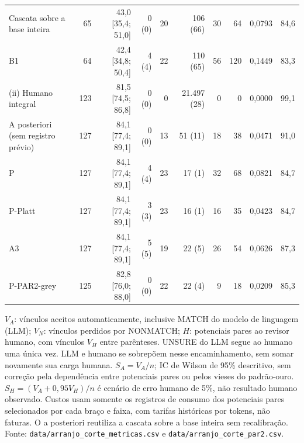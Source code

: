 \begin{longtable}{lrrrrrrrrr}
Cascata sobre a base inteira & 65 & 43,0 [35,4; 51,0] & 0 (0) & 20 & 106 (66) & 30 & 64 & 0,0793 & 84,6 \\
B1 & 64 & 42,4 [34,8; 50,4] & 4 (4) & 22 & 110 (65) & 56 & 120 & 0,1449 & 83,3 \\
(ii) Humano integral & 123 & 81,5 [74,5; 86,8] & 0 (0) & 0 & 21.497 (28) & 0 & 0 & 0,0000 & 99,1 \\
A posteriori (sem registro prévio) & 127 & 84,1 [77,4; 89,1] & 0 (0) & 13 & 51 (11) & 18 & 38 & 0,0471 & 91,0 \\
P & 127 & 84,1 [77,4; 89,1] & 4 (4) & 23 & 17 (1) & 32 & 68 & 0,0821 & 84,7 \\
P-Platt & 127 & 84,1 [77,4; 89,1] & 3 (3) & 23 & 16 (1) & 16 & 35 & 0,0423 & 84,7 \\
A3 & 127 & 84,1 [77,4; 89,1] & 5 (5) & 19 & 22 (5) & 26 & 54 & 0,0626 & 87,3 \\
P-PAR2-grey & 125 & 82,8 [76,0; 88,0] & 0 (0) & 22 & 22 (4) & 9 & 18 & 0,0209 & 85,3 \\
\end{longtable}
\noindent\parbox{\linewidth}{\footnotesize $V_A$: vínculos aceitos automaticamente, inclusive MATCH do modelo de linguagem (LLM); $V_N$: vínculos perdidos por NONMATCH; $H$: potenciais pares ao revisor humano, com vínculos $V_H$ entre parênteses. UNSURE do LLM segue ao humano uma única vez. LLM e humano se sobrepõem nesse encaminhamento, sem somar novamente sua carga humana. $S_A=V_A/n$; IC de Wilson de 95\% descritivo, sem correção pela dependência entre potenciais pares ou pelos vieses do padrão-ouro. $S_H=(V_A+0{,}95V_H)/n$ é cenário de erro humano de 5\%, não resultado humano observado. Custos usam somente os registros de consumo dos potenciais pares selecionados por cada braço e faixa, com tarifas históricas por tokens, não faturas. O a posteriori reutiliza a cascata sobre a base inteira sem recalibração. Fonte: \texttt{data/arranjo\_corte\_metricas.csv} e \texttt{data/arranjo\_corte\_par2.csv}.}
